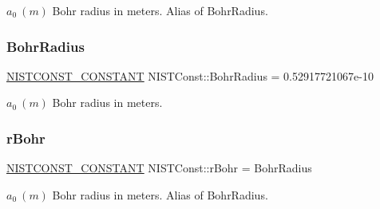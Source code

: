 $a_0 \ (m)$ Bohr radius in meters. Alias of Bohr\+Radius. \mbox{\label{group___n_i_s_t_const-_bohr_radius_ga9a18bd8c20d78ff8ad8747cdd623a07b}} 
\subsubsection{\texorpdfstring{Bohr\+Radius}{BohrRadius}}
{\footnotesize\ttfamily \mbox{\hyperlink{group___n_i_s_t_const-_macros_ga2b0fc1d7452373f816175dd86ce26729}{N\+I\+S\+T\+C\+O\+N\+S\+T\+\_\+\+C\+O\+N\+S\+T\+A\+NT}} N\+I\+S\+T\+Const\+::\+Bohr\+Radius = 0.\+52917721067e-\/10}

$a_0 \ (m)$ Bohr radius in meters. \mbox{\label{group___n_i_s_t_const-_bohr_radius_ga49c016a62c072bfa4f02c47b84743a3d}} 
\subsubsection{\texorpdfstring{r\+Bohr}{rBohr}}
{\footnotesize\ttfamily \mbox{\hyperlink{group___n_i_s_t_const-_macros_ga2b0fc1d7452373f816175dd86ce26729}{N\+I\+S\+T\+C\+O\+N\+S\+T\+\_\+\+C\+O\+N\+S\+T\+A\+NT}} N\+I\+S\+T\+Const\+::r\+Bohr = Bohr\+Radius}

$a_0 \ (m)$ Bohr radius in meters. Alias of Bohr\+Radius. 